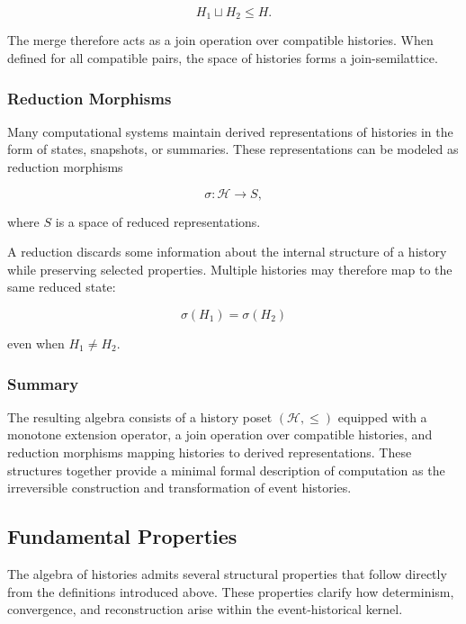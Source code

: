 \documentclass[12pt]{article}
\begin{document}
\[
H_1 \sqcup H_2 \leq H.
\]

The merge therefore acts as a join operation over
compatible histories. When defined for all compatible
pairs, the space of histories forms a join-semilattice.

\subsubsection{Reduction Morphisms}

Many computational systems maintain derived representations
of histories in the form of states, snapshots, or summaries.
These representations can be modeled as reduction morphisms

\[
\sigma : \mathcal{H} \rightarrow S,
\]

where $S$ is a space of reduced representations.

A reduction discards some information about the internal
structure of a history while preserving selected properties.
Multiple histories may therefore map to the same reduced
state:

\[
\sigma(H_1) = \sigma(H_2)
\]

even when $H_1 \neq H_2$.

\subsubsection{Summary}

The resulting algebra consists of a history poset
$(\mathcal{H}, \leq)$ equipped with a monotone extension
operator, a join operation over compatible histories,
and reduction morphisms mapping histories to derived
representations. These structures together provide a
minimal formal description of computation as the
irreversible construction and transformation of
event histories.


\subsection{Fundamental Properties}

The algebra of histories admits several structural
properties that follow directly from the definitions
introduced above. These properties clarify how
determinism, convergence, and reconstruction arise
within the event-historical kernel.
\end{document}

